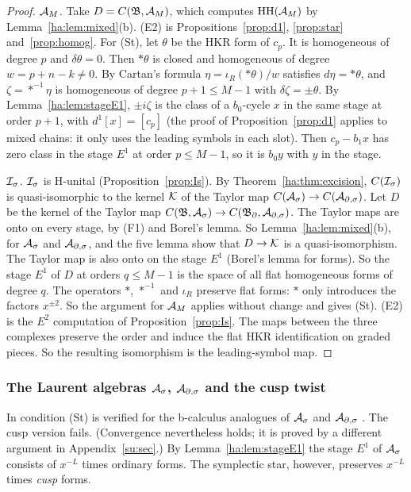 \begin{proof}
\emph{\(\mathcal A_M\).} Take \(D=C(\mathfrak B,\mathcal A_M)\), which computes
\(\operatorname{HH}(\mathcal A_M)\) by Lemma~\ref{ha:lem:mixed}(b). (E2) is
Propositions~\ref{prop:d1}, \ref{prop:star} and~\ref{prop:homog}. For
(St), let \(\theta\) be the HKR form of \(c_p\). It is homogeneous of
degree \(p\) and \(\delta\theta=0\). Then \(*\theta\) is closed and
homogeneous of degree \(w=p+n-k\ne0\). By Cartan's formula \(\eta=
\iota_R(*\theta)/w\) satisfies \(d\eta=*\theta\), and \(\zeta=*^{-1}\eta\)
is homogeneous of degree \(p+1\le M-1\) with \(\delta\zeta=\pm\theta\). By
Lemma~\ref{ha:lem:stageE1}, \(\pm i\zeta\) is the class of a \(b_0\)-cycle
\(x\) in the same stage at order \(p+1\), with \(d^1[x]=[c_p]\) (the
proof of Proposition~\ref{prop:d1} applies to mixed chains: it only uses
the leading symbols in each slot). Then \(c_p-b_1x\) has zero class in the
stage \(E^1\) at order \(p\le M-1\), so it is \(b_0y\) with \(y\) in the
stage.

\emph{\(\mathcal I_\sigma\).} \(\mathcal I_\sigma\) is H-unital (Proposition~\ref{prop:Is}). By
Theorem~\ref{ha:thm:excision}, \(C(\mathcal I_\sigma)\) is quasi-isomorphic to the kernel
\(\mathcal K\) of the Taylor map \(C(\mathcal A_\sigma)\to C(\mathcal A_{\partial,\sigma})\). Let \(D\) be the kernel
of the Taylor map \(C(\mathfrak B,\mathcal A_\sigma)\to C(\mathfrak B_\partial,\mathcal A_{\partial,\sigma})\).
The Taylor maps are onto on every stage, by (F1) and Borel's lemma. So
Lemma~\ref{ha:lem:mixed}(b), for \(\mathcal A_\sigma\) and \(\mathcal A_{\partial,\sigma}\), and the five lemma
show that \(D\to\mathcal K\) is a quasi-isomorphism. The Taylor map is also onto
on the stage \(E^1\) (Borel's lemma for forms). So the stage \(E^1\) of
\(D\) at orders \(q\le M-1\) is the space of all flat homogeneous forms
of degree \(q\). The operators \(*\), \(*^{-1}\) and \(\iota_R\) preserve
flat forms: \(*\) only introduces the factors \(x^{\pm2}\). So the
argument for \(\mathcal A_M\) applies without change and gives (St). (E2) is the
\(E^2\) computation of Proposition~\ref{prop:Is}. The maps between the
three complexes preserve the order and induce the flat HKR
identification on graded pieces. So the resulting isomorphism is the
leading-symbol map.
\end{proof}

\subsubsection*{The Laurent algebras \(\mathcal A_\sigma\), \(\mathcal A_{\partial,\sigma}\) and the cusp twist}
In \cite{HHb} condition (St) is verified for the b-calculus analogues of
\(\mathcal A_\sigma\) and \(\mathcal A_{\partial,\sigma}\) \cite[Lemma ``Lifts in a fixed coefficient
stage'']{HHb}. The cusp version fails. (Convergence nevertheless holds;
it is proved by a different argument in Appendix~\ref{su:sec}.) By Lemma~\ref{ha:lem:stageE1} the
stage \(E^1\) of \(\mathcal A_\sigma\) consists of \(x^{-L}\) times ordinary forms. The
symplectic star, however, preserves \(x^{-L}\) times \emph{cusp} forms.

